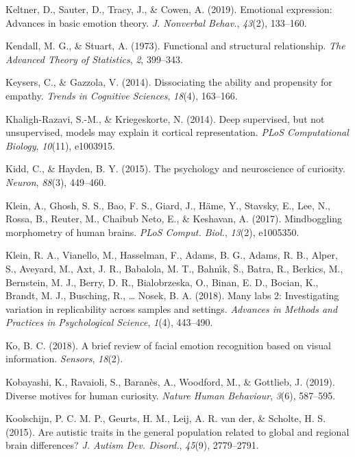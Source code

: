 \documentclass[12pt,american,a4paper,oneside,]{memoir} %
\begin{document}
\leavevmode\hypertarget{ref-Keltner2019-tm}{}%
Keltner, D., Sauter, D., Tracy, J., \& Cowen, A. (2019). Emotional expression: Advances in basic emotion theory. \emph{J. Nonverbal Behav.}, \emph{43}(2), 133--160.

\leavevmode\hypertarget{ref-kendall1973functional}{}%
Kendall, M. G., \& Stuart, A. (1973). Functional and structural relationship. \emph{The Advanced Theory of Statistics}, \emph{2}, 399--343.

\leavevmode\hypertarget{ref-keysers2014dissociating}{}%
Keysers, C., \& Gazzola, V. (2014). Dissociating the ability and propensity for empathy. \emph{Trends in Cognitive Sciences}, \emph{18}(4), 163--166.

\leavevmode\hypertarget{ref-khaligh2014deep}{}%
Khaligh-Razavi, S.-M., \& Kriegeskorte, N. (2014). Deep supervised, but not unsupervised, models may explain it cortical representation. \emph{PLoS Computational Biology}, \emph{10}(11), e1003915.

\leavevmode\hypertarget{ref-kidd2015psychology}{}%
Kidd, C., \& Hayden, B. Y. (2015). The psychology and neuroscience of curiosity. \emph{Neuron}, \emph{88}(3), 449--460.

\leavevmode\hypertarget{ref-Klein2017-su}{}%
Klein, A., Ghosh, S. S., Bao, F. S., Giard, J., Häme, Y., Stavsky, E., Lee, N., Rossa, B., Reuter, M., Chaibub Neto, E., \& Keshavan, A. (2017). Mindboggling morphometry of human brains. \emph{PLoS Comput. Biol.}, \emph{13}(2), e1005350.

\leavevmode\hypertarget{ref-Klein2018-un}{}%
Klein, R. A., Vianello, M., Hasselman, F., Adams, B. G., Adams, R. B., Alper, S., Aveyard, M., Axt, J. R., Babalola, M. T., Bahnı́k, Š., Batra, R., Berkics, M., Bernstein, M. J., Berry, D. R., Bialobrzeska, O., Binan, E. D., Bocian, K., Brandt, M. J., Busching, R., \ldots{} Nosek, B. A. (2018). Many labs 2: Investigating variation in replicability across samples and settings. \emph{Advances in Methods and Practices in Psychological Science}, \emph{1}(4), 443--490.

\leavevmode\hypertarget{ref-Ko2018-rv}{}%
Ko, B. C. (2018). A brief review of facial emotion recognition based on visual information. \emph{Sensors}, \emph{18}(2).

\leavevmode\hypertarget{ref-kobayashi2019diverse}{}%
Kobayashi, K., Ravaioli, S., Baranès, A., Woodford, M., \& Gottlieb, J. (2019). Diverse motives for human curiosity. \emph{Nature Human Behaviour}, \emph{3}(6), 587--595.

\leavevmode\hypertarget{ref-Koolschijn2015-hd}{}%
Koolschijn, P. C. M. P., Geurts, H. M., Leij, A. R. van der, \& Scholte, H. S. (2015). Are autistic traits in the general population related to global and regional brain differences? \emph{J. Autism Dev. Disord.}, \emph{45}(9), 2779--2791.
\end{document}
